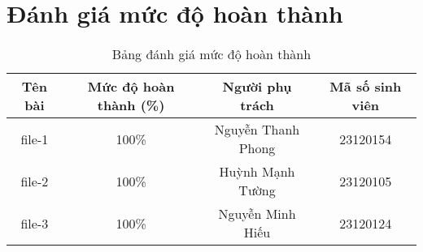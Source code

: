\section{Đánh giá mức độ hoàn thành}

\begin{table}[H]
    \centering
    \begin{tabular}{|c|c|c|c|}
    \hline
    \textbf{Tên bài} & \textbf{Mức độ hoàn thành (\%)} & \textbf{Người phụ trách} & \textbf{Mã số sinh viên} \\ \hline
    file-1 & 100\% & Nguyễn Thanh Phong & 23120154 \\ \hline
    file-2 & 100\% & Huỳnh Mạnh Tường & 23120105 \\ \hline
    file-3 & 100\% & Nguyễn Minh Hiếu & 23120124 \\ \hline
    \end{tabular}
    \caption{Bảng đánh giá mức độ hoàn thành}
    \label{tab:hoanthanh}
\end{table}